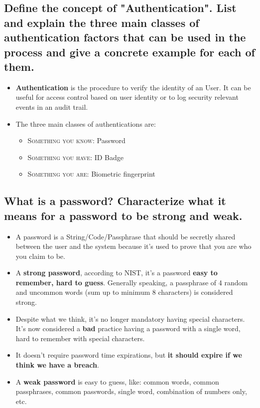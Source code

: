 \documentclass[9pt, letterpaper]{article}
\begin{document}
\subsection{Define the concept of "Authentication". List and explain the three main classes of authentication factors that can be used in the process and give a concrete example for each of them.}
\begin{itemize}
	\item \textbf{Authentication} is the procedure to verify the identity of an User. It can be useful for access control based on user identity or to log security relevant events in an audit trail.
	\item The three main classes of authentications are:
	\begin{itemize}
		\item \textsc{Something you know}: Password
		\item \textsc{Something you have}: ID Badge
		\item \textsc{Something you are}: Biometric fingerprint
	\end{itemize}
\end{itemize}

\subsection{What is a password? Characterize what it means for a password to be strong and weak.}
\begin{itemize}
	\item A password is a String/Code/Passphrase that should be secretly shared between the user and the system because it's used to prove that you are who you claim to be.
	\item A \textbf{strong password}, according to NIST, it's a password \textbf{easy to remember, hard to guess}. Generally speaking, a passphrase of 4 random and uncommon words (sum up to minimum 8 characters) is considered strong.
	\item Despite what we think, it's no longer mandatory having special characters. It's now considered a \textbf{bad} practice having a password with a single word, hard to remember with special characters.
	\item It doesn't require password time expirations, but \textbf{it should expire if we think we have a breach}.
	\item A \textbf{weak password} is easy to guess, like: common words, common passphrases, common passwords, single word, combination of numbers only, etc.
\end{itemize}
\end{document}
